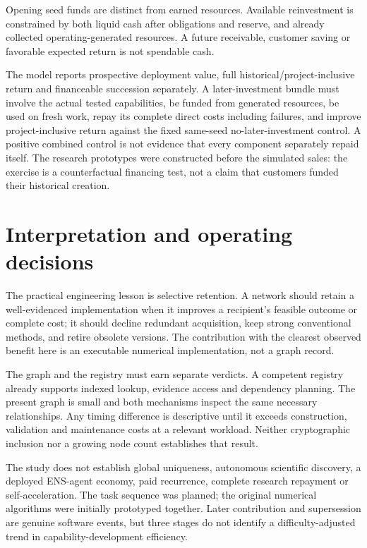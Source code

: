 \documentclass[11pt,letterpaper]{article}
\begin{document}
Opening seed funds are distinct from earned resources. Available reinvestment is constrained by both liquid cash after obligations and reserve, and already collected operating-generated resources. A future receivable, customer saving or favorable expected return is not spendable cash.

The model reports prospective deployment value, full historical/project-inclusive return and financeable succession separately. A later-investment bundle must involve the actual tested capabilities, be funded from generated resources, be used on fresh work, repay its complete direct costs including failures, and improve project-inclusive return against the fixed same-seed no-later-investment control. A positive combined control is not evidence that every component separately repaid itself. The research prototypes were constructed before the simulated sales: the exercise is a counterfactual financing test, not a claim that customers funded their historical creation.

\section{Interpretation and operating decisions}

The practical engineering lesson is selective retention. A network should retain a well-evidenced implementation when it improves a recipient's feasible outcome or complete cost; it should decline redundant acquisition, keep strong conventional methods, and retire obsolete versions. The contribution with the clearest observed benefit here is an executable numerical implementation, not a graph record.

The graph and the registry must earn separate verdicts. A competent registry already supports indexed lookup, evidence access and dependency planning. The present graph is small and both mechanisms inspect the same necessary relationships. Any timing difference is descriptive until it exceeds construction, validation and maintenance costs at a relevant workload. Neither cryptographic inclusion nor a growing node count establishes that result.

The study does not establish global uniqueness, autonomous scientific discovery, a deployed ENS-agent economy, paid recurrence, complete research repayment or self-acceleration. The task sequence was planned; the original numerical algorithms were initially prototyped together. Later contribution and supersession are genuine software events, but three stages do not identify a difficulty-adjusted trend in capability-development efficiency.
\end{document}
